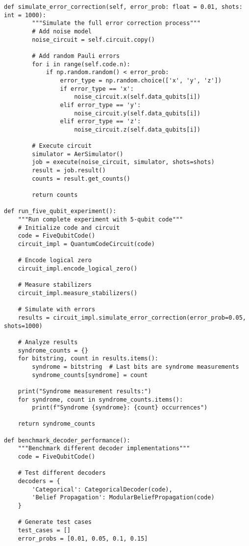 \documentclass[12pt,a4paper]{article}
\begin{document}
\begin{lstlisting}[style=python,caption=Quantum circuit implementations using Qiskit]
    def simulate_error_correction(self, error_prob: float = 0.01, shots: int = 1000):
        """Simulate the full error correction process"""
        # Add noise model
        noise_circuit = self.circuit.copy()
        
        # Add random Pauli errors
        for i in range(self.code.n):
            if np.random.random() < error_prob:
                error_type = np.random.choice(['x', 'y', 'z'])
                if error_type == 'x':
                    noise_circuit.x(self.data_qubits[i])
                elif error_type == 'y':
                    noise_circuit.y(self.data_qubits[i])
                elif error_type == 'z':
                    noise_circuit.z(self.data_qubits[i])
        
        # Execute circuit
        simulator = AerSimulator()
        job = execute(noise_circuit, simulator, shots=shots)
        result = job.result()
        counts = result.get_counts()
        
        return counts

def run_five_qubit_experiment():
    """Run complete experiment with 5-qubit code"""
    # Initialize code and circuit
    code = FiveQubitCode()
    circuit_impl = QuantumCodeCircuit(code)
    
    # Encode logical zero
    circuit_impl.encode_logical_zero()
    
    # Measure stabilizers
    circuit_impl.measure_stabilizers()
    
    # Simulate with errors
    results = circuit_impl.simulate_error_correction(error_prob=0.05, shots=1000)
    
    # Analyze results
    syndrome_counts = {}
    for bitstring, count in results.items():
        syndrome = bitstring  # Last bits are syndrome measurements
        syndrome_counts[syndrome] = count
    
    print("Syndrome measurement results:")
    for syndrome, count in syndrome_counts.items():
        print(f"Syndrome {syndrome}: {count} occurrences")
    
    return syndrome_counts

def benchmark_decoder_performance():
    """Benchmark different decoder implementations"""
    code = FiveQubitCode()
    
    # Test different decoders
    decoders = {
        'Categorical': CategoricalDecoder(code),
        'Belief Propagation': ModularBeliefPropagation(code)
    }
    
    # Generate test cases
    test_cases = []
    error_probs = [0.01, 0.05, 0.1, 0.15]
    

\end{lstlisting}
\end{document}
